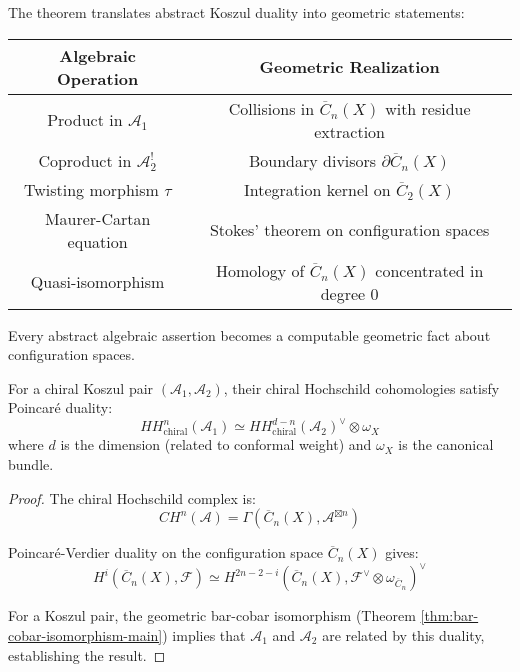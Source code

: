 \begin{remark}
\label{rem:geometric-content-koszul}
The theorem translates abstract Koszul duality into geometric statements:

\begin{center}
\begin{tabular}{c|c}
\textbf{Algebraic Operation} & \textbf{Geometric Realization} \\ \hline
Product in $\mathcal{A}_1$ & Collisions in $\overline{C}_n(X)$ with residue extraction \\
Coproduct in $\mathcal{A}_2^!$ & Boundary divisors $\partial \overline{C}_n(X)$ \\
Twisting morphism $\tau$ & Integration kernel on $\overline{C}_2(X)$ \\
Maurer-Cartan equation & Stokes' theorem on configuration spaces \\
Quasi-isomorphism & Homology of $\overline{C}_n(X)$ concentrated in degree 0
\end{tabular}
\end{center}

Every abstract algebraic assertion becomes a computable geometric fact about configuration spaces.
\end{remark}

\begin{corollary}
\label{cor:hochschild-duality}
For a chiral Koszul pair $(\mathcal{A}_1, \mathcal{A}_2)$, their chiral Hochschild 
cohomologies satisfy Poincaré duality:
$$HH^n_{\text{chiral}}(\mathcal{A}_1) \simeq HH^{d-n}_{\text{chiral}}(\mathcal{A}_2)^{\vee} 
   \otimes \omega_X$$
where $d$ is the dimension (related to conformal weight) and $\omega_X$ is the canonical bundle.
\end{corollary}

\begin{proof}
The chiral Hochschild complex is:
$$CH^n(\mathcal{A}) = \Gamma\left(\overline{C}_n(X), \mathcal{A}^{\boxtimes n}\right)$$

Poincaré-Verdier duality on the configuration space $\overline{C}_n(X)$ gives:
$$H^i(\overline{C}_n(X), \mathcal{F}) \simeq H^{2n-2-i}(\overline{C}_n(X), 
   \mathcal{F}^{\vee} \otimes \omega_{\overline{C}_n})^{\vee}$$

For a Koszul pair, the geometric bar-cobar isomorphism (Theorem \ref{thm:bar-cobar-isomorphism-main}) 
implies that $\mathcal{A}_1$ and $\mathcal{A}_2$ are related by this duality, establishing 
the result.
\end{proof}

